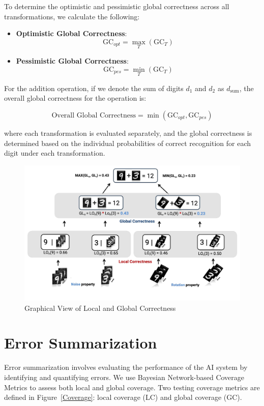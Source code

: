 To determine the optimistic and pessimistic global correctness across all transformations, we calculate the following:

\begin{itemize}
    \item \textbf{Optimistic Global Correctness}:
    \[ \text{GC}_{opt} = \max_{T} (\text{GC}_{T}) \]
    \item \textbf{Pessimistic Global Correctness}:
    \[ \text{GC}_{pes} = \min_{T} (\text{GC}_{T}) \]
\end{itemize}

For the addition operation, if we denote the sum of digits $d_1$ and $d_2$ as $d_{\text{sum}}$, the overall global correctness for the operation is:

\[ \text{Overall Global Correctness} = \min(\text{GC}_{opt}, \text{GC}_{pes}) \]

where each transformation is evaluated separately, and the global correctness is determined based on the individual probabilities of correct recognition for each digit under each transformation.

\begin{figure}[h]
    \centering
    \includegraphics[width=\linewidth]{figures/noise_rotation_localcal_global.pdf}
    \caption{Graphical View of Local and Global Correctness}
    \label{fig:graph}
\end{figure}

\section{Error Summarization}

Error summarization involves evaluating the performance of the AI system by identifying and quantifying errors. We use Bayesian Network-based Coverage Metrics to assess both local and global coverage. Two testing coverage metrics are defined in Figure~\ref{Coverage}: local coverage (LC) and global coverage (GC).

